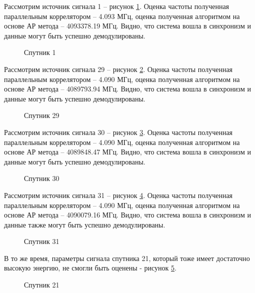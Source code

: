 Рассмотрим источник сигнала 1 – рисунок \ref{pic:5mhz_sat_1}. Оценка частоты полученная параллельным коррелятором – 4.093 МГц,
оценка полученная алгоритмом на основе АР метода – 4093378.19 МГц. Видно, что система вошла в синхронизм и данные могут быть успешно демодулированы.
\begin{figure}[h]
\center{}
	\caption{Спутник 1}
	\label{pic:5mhz_sat_1}
\end{figure}

Рассмотрим источник сигнала 29 – рисунок \ref{pic:5mhz_sat_29}. Оценка частоты полученная параллельным коррелятором – 4.090 МГц,
оценка полученная алгоритмом на основе АР метода – 4089793.94 МГц. Видно, что система вошла в синхронизм и данные могут быть успешно демодулированы.
\begin{figure}[h]
\center{}
	\caption{Спутник 29}
	\label{pic:5mhz_sat_29}
\end{figure}

Рассмотрим источник сигнала 30 – рисунок \ref{pic:5mhz_sat_30}. Оценка частоты полученная параллельным коррелятором – 4.090 МГц,
оценка полученная алгоритмом на основе АР метода – 4089848.47 МГц. Видно, что система вошла в синхронизм и данные могут быть успешно демодулированы.
\begin{figure}[h]
\center{}
	\caption{Спутник 30}
	\label{pic:5mhz_sat_30}
\end{figure}

Рассмотрим источник сигнала 31 – рисунок \ref{pic:5mhz_sat_31}. Оценка частоты полученная параллельным коррелятором – 4.090 МГц,
оценка полученная алгоритмом на основе АР метода – 4090079.16 МГц. Видно, что система вошла в синхронизм и данные также могут быть успешно демодулированы.
\begin{figure}[h]
\center{}
	\caption{Спутник 31}
	\label{pic:5mhz_sat_31}
\end{figure}

В то же время, параметры сигнала спутника 21, который тоже имеет достаточно высокую энергию, не смогли быть оценены - рисунок \ref{pic:5mhz_sat_21}.
\begin{figure}[h]
\center{}
	\caption{Спутник 21}
	\label{pic:5mhz_sat_21}
\end{figure}

